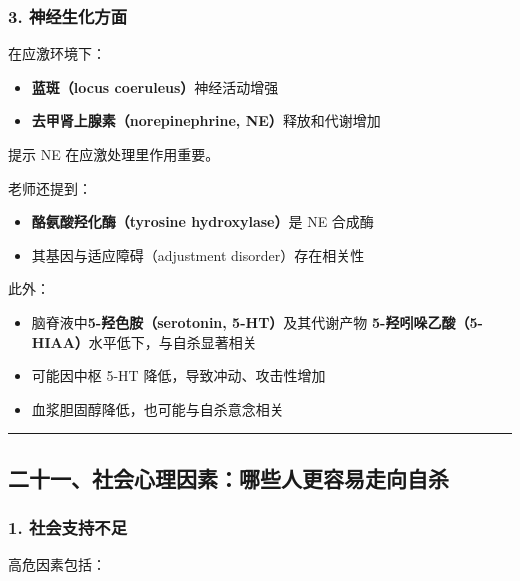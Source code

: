 \documentclass[
  chinese,
  9pt,
  a4paper,
]{ctexart}
\providecommand{\tightlist}{%
  \setlength{\itemsep}{0pt}\setlength{\parskip}{0pt}}
\begin{document}
\subsubsection{3.
神经生化方面}\label{ux795eux7ecfux751fux5316ux65b9ux9762}

在应激环境下：

\begin{itemize}
\tightlist
\item
  \textbf{蓝斑（locus coeruleus）}神经活动增强
\item
  \textbf{去甲肾上腺素（norepinephrine, NE）}释放和代谢增加
\end{itemize}

提示 NE 在应激处理里作用重要。

老师还提到：

\begin{itemize}
\tightlist
\item
  \textbf{酪氨酸羟化酶（tyrosine hydroxylase）}是 NE 合成酶
\item
  其基因与适应障碍（adjustment disorder）存在相关性
\end{itemize}

此外：

\begin{itemize}
\tightlist
\item
  脑脊液中\textbf{5-羟色胺（serotonin, 5-HT）}及其代谢产物
  \textbf{5-羟吲哚乙酸（5-HIAA）}水平低下，与自杀显著相关
\item
  可能因中枢 5-HT 降低，导致冲动、攻击性增加
\item
  血浆胆固醇降低，也可能与自杀意念相关
\end{itemize}

\begin{center}\rule{0.5\linewidth}{0.5pt}\end{center}

\subsection{二十一、社会心理因素：哪些人更容易走向自杀}\label{ux4e8cux5341ux4e00ux793eux4f1aux5fc3ux7406ux56e0ux7d20ux54eaux4e9bux4ebaux66f4ux5bb9ux6613ux8d70ux5411ux81eaux6740}

\subsubsection{1.
社会支持不足}\label{ux793eux4f1aux652fux6301ux4e0dux8db3}

高危因素包括：
\end{document}
